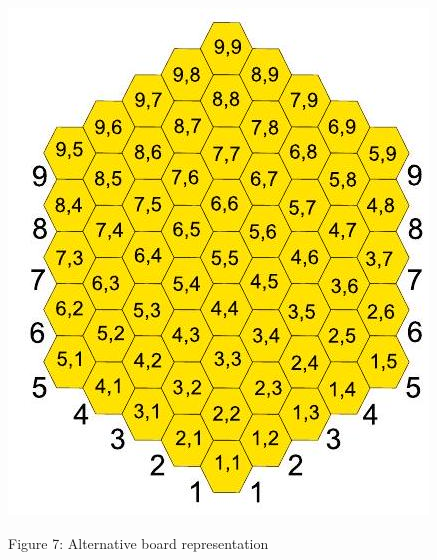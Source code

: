 \documentclass[10pt]{article}
\begin{document}
\begin{center}
\includegraphics[max width=\textwidth]{2024_09_21_575efd6e0a8f951a52dfg-7(1)}
\end{center}

Figure 7: Alternative board representation
\end{document}
